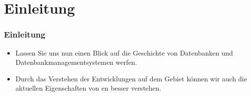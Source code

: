 \documentclass[aspectratio=169,mathserif,notheorems]{beamer}%
\subtitle{4.~Geschichte}%
\begin{document}
%
%
\startPresentation%
%
\section{Einleitung}%
%
\begin{frame}[t]%
\frametitle{Einleitung}%
\begin{itemize}%
%
\item Lassen Sie uns nun einen Blick auf die Geschichte von Datenbanken und Datenbankmanagementsystemen werfen\cite{S2024D:THOD,Q2022ATODHDM,M2024ABHOD,YM2024DDMSD,F2021ABHODM}.%
\item<2-> Durch das Verstehen der Entwicklungen auf dem Gebiet können wir auch die aktuellen Eigenschaften von en besser verstehen.%
%
\end{itemize}%
\end{frame}%
%
\end{document}
